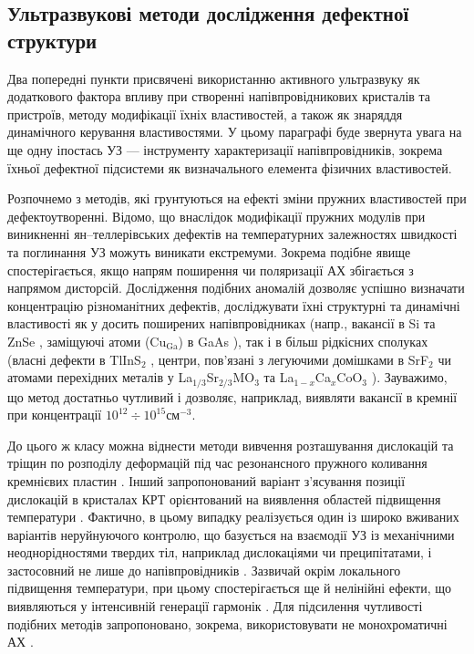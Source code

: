 \subsection{Ультразвукові методи дослідження дефектної структури\label{secUSMethod}}

Два попередні пункти присвячені використанню активного ультразвуку як додаткового фактора впливу при створенні напівпровідникових кристалів та пристроїв,  методу модифікації їхніх властивостей, а також як знаряддя динамічного керування властивостями.
У цьому параграфі буде звернута увага на ще одну іпостась УЗ --- інструменту характеризації напівпровідників, зокрема їхньої дефектної підсистеми як визначального елемента фізичних властивостей.


Розпочнемо з методів, які грунтуються на ефекті зміни пружних властивостей при дефектоутворенні.
 Відомо, що внаслідок модифікації пружних модулів при виникненні ян--теллерівських дефектів на температурних залежностях швидкості та поглинання УЗ можуть виникати екстремуми.
Зокрема подібне явище спостерігається, якщо напрям поширення чи поляризації АХ збігається з напрямом дисторсій.
Дослідження подібних аномалій дозволяє успішно визначати концентрацію різноманітних дефектів, досліджувати їхні структурні та динамічні властивості
як у досить поширених напівпровідниках (напр., вакансії в Si \cite{USM:Goto2006,USM:Okabe2013,USM:Mitsumoto2014,USM:Akatsu2009} та ZnSe \cite{USM:Averkin2014},
заміщуючі атоми (Cu$_\text{Ga}$) в GaAs \cite{USM:Averkin2014:2}),
так і в більш рідкісних сполуках (власні дефекти в TlInS$_2$ \cite{USM:SEYIDOV2016}, центри, пов'язані з легуючими домішками в SrF$_2$ \cite{USM:Zhevstovskikh} чи атомами перехідних металів у La$_{1/3}$Sr$_{2/3}$MO$_3$ \cite{USM:HUI2012} та La$_{1-x}$Ca$_x$CoO$_3$ \cite{USM:YI2009}).
Зауважимо, що метод достатньо чутливий і дозволяє, наприклад, виявляти вакансії в кремнії  при концентрації $10^{12}\div10^{15}$см$^{-3}$.


До цього ж класу можна віднести методи вивчення розташування дислокацій та тріщин по розподілу деформацій під час резонансного пружного коливання кремнієвих пластин \cite{BELYAEV2001,OstapConf2,OstapConf3,Ostap:Method}.
Інший запропонований варіант з'ясування позиції дислокацій в кристалах КРТ орієнтований на виявлення областей підвищення температури \cite{savkina2004disl,SAVKINA2005disl}.
Фактично, в цьому випадку реалізується один із широко вживаних варіантів неруйнуючого контролю, що базується на взаємодії УЗ із механічними неоднорідностями твердих тіл, наприклад дислокаціями чи преципітатами, і застосовний не лише до напівпровідників \cite{USM:NDEsteel}.
Зазвичай окрім локального підвищення температури, при цьому спостерігається ще й нелінійні ефекти, що виявляються у інтенсивній генерації гармонік \cite{USM:NDEsteel,USM:NDE}.
Для підсилення чутливості подібних методів запропоновано, зокрема, використовувати не монохроматичні АХ  \cite{USM:NDE}.

